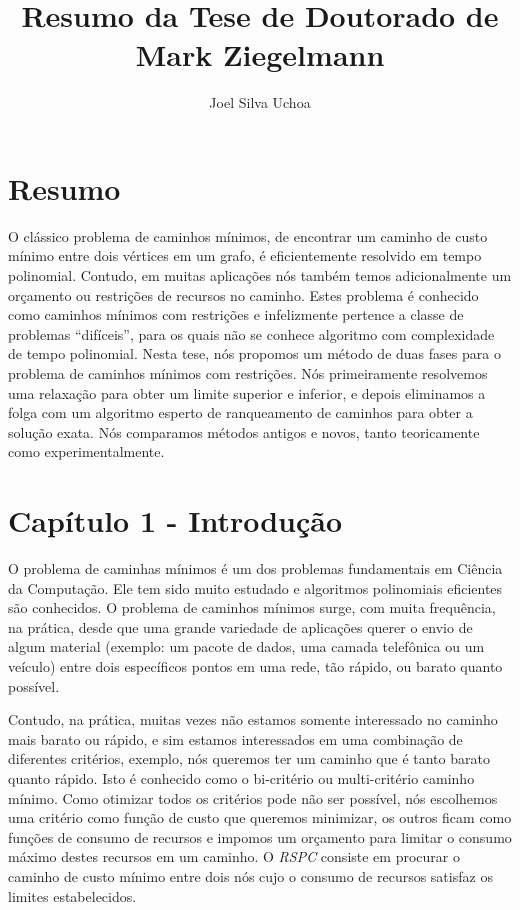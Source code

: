 \documentclass[10pt,a4paper]{article}
\author{Joel Silva Uchoa}
\title{Resumo da Tese de Doutorado de Mark Ziegelmann}
\begin{document}
\maketitle

\section{Resumo}

O clássico problema de caminhos mínimos, de encontrar um caminho de 
custo mínimo entre dois vértices em um grafo, é eficientemente resolvido 
em tempo polinomial. Contudo, em muitas aplicações nós também temos 
adicionalmente um orçamento ou restrições de recursos no caminho. Estes 
problema é conhecido como caminhos mínimos com restrições e infelizmente 
pertence a classe de problemas ``difíceis'', para os quais não se 
conhece algoritmo com complexidade de tempo polinomial. Nesta tese, nós 
propomos um método de duas fases para o problema de caminhos mínimos com 
restrições. Nós primeiramente resolvemos uma relaxação para obter um 
limite superior e inferior, e depois eliminamos a folga com um algoritmo 
esperto de ranqueamento de caminhos para obter a solução exata. Nós 
comparamos métodos antigos e novos, tanto teoricamente como 
experimentalmente.

\section{Capítulo 1 - Introdução}

O problema de caminhas mínimos é um dos problemas fundamentais em 
Ciência da Computação. Ele tem sido muito estudado e algoritmos 
polinomiais eficientes são conhecidos. O problema de caminhos mínimos 
surge, com muita frequência, na prática, desde que uma grande variedade 
de aplicações querer o envio de algum material (exemplo: um pacote de 
dados, uma camada telefônica ou um veículo) entre dois específicos 
pontos em uma rede, tão rápido, ou barato quanto possível.

Contudo, na prática, muitas vezes não estamos somente interessado no 
caminho mais barato ou rápido, e sim estamos interessados em uma 
combinação de diferentes critérios, exemplo, nós queremos ter um caminho 
que é tanto barato quanto rápido. Isto é conhecido como o bi-critério ou 
multi-critério caminho mínimo. Como otimizar todos os critérios pode não 
ser possível, nós escolhemos uma critério como função de custo que 
queremos minimizar, os outros ficam como funções de consumo de recursos 
e impomos um orçamento para limitar o consumo máximo destes recursos em 
um caminho. O \emph{RSPC} consiste em procurar o caminho de custo mínimo 
entre dois nós cujo o consumo de recursos satisfaz os limites 
estabelecidos.
\end{document}
